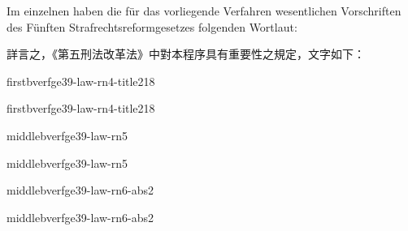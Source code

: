 \documentclass[12pt]{article}
\begin{document}
\syncleft
\begin{sourcepara}
Im einzelnen haben die für das vorliegende Verfahren wesentlichen Vorschriften des Fünften Strafrechtsreformgesetzes folgenden Wortlaut:
\end{sourcepara}
\begin{transpara}
詳言之，《第五刑法改革法》中對本程序具有重要性之規定，文字如下：
\end{transpara}

\syncleft
\begin{sourceboxpara}
\begin{lawboxpart}{first}{bverfge39-law-rn4-title218}
\end{lawboxpart}
\end{sourceboxpara}
\begin{transboxpara}
\begin{lawboxpart}{first}{bverfge39-law-rn4-title218}
\end{lawboxpart}
\end{transboxpara}

\syncleft
\begin{sourceboxpara}
\begin{lawboxpart}{middle}{bverfge39-law-rn5}
\end{lawboxpart}
\end{sourceboxpara}
\begin{transboxpara}
\begin{lawboxpart}{middle}{bverfge39-law-rn5}
\end{lawboxpart}
\end{transboxpara}

\syncleft
\begin{sourceboxpara}
\begin{lawboxpart}{middle}{bverfge39-law-rn6-abs2}
\end{lawboxpart}
\end{sourceboxpara}
\begin{transboxpara}
\begin{lawboxpart}{middle}{bverfge39-law-rn6-abs2}
\end{lawboxpart}
\end{transboxpara}
\end{document}
